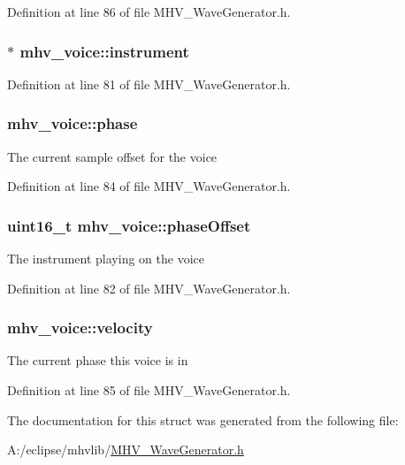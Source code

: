 Definition at line 86 of file M\-H\-V\-\_\-\-Wave\-Generator.\-h.

\hypertarget{structmhv__voice_ad13f45665cd3e683530f21ac2824aa5d}{
\subsubsection[{instrument}]{$\ast$ mhv\-\_\-voice\-::instrument}}\label{structmhv__voice_ad13f45665cd3e683530f21ac2824aa5d}


Definition at line 81 of file M\-H\-V\-\_\-\-Wave\-Generator.\-h.

\hypertarget{structmhv__voice_acb00a6c0fe99ecfebb9f5b1ed66c51be}{
\subsubsection[{phase}]{ mhv\-\_\-voice\-::phase}}\label{structmhv__voice_acb00a6c0fe99ecfebb9f5b1ed66c51be}
The current sample offset for the voice 

Definition at line 84 of file M\-H\-V\-\_\-\-Wave\-Generator.\-h.

\hypertarget{structmhv__voice_a24e2f2d4a979d1f00b338b48f741c217}{
\subsubsection[{phase\-Offset}]{\setlength{\rightskip}{0pt plus 5cm}uint16\-\_\-t mhv\-\_\-voice\-::phase\-Offset}}\label{structmhv__voice_a24e2f2d4a979d1f00b338b48f741c217}
The instrument playing on the voice 

Definition at line 82 of file M\-H\-V\-\_\-\-Wave\-Generator.\-h.

\hypertarget{structmhv__voice_a8f99a4e928e8698be419b3863232bc62}{
\subsubsection[{velocity}]{ mhv\-\_\-voice\-::velocity}}\label{structmhv__voice_a8f99a4e928e8698be419b3863232bc62}
The current phase this voice is in 

Definition at line 85 of file M\-H\-V\-\_\-\-Wave\-Generator.\-h.



The documentation for this struct was generated from the following file\-:\begin{DoxyCompactItemize}
\item 
A\-:/eclipse/mhvlib/\hyperlink{_m_h_v___wave_generator_8h}{M\-H\-V\-\_\-\-Wave\-Generator.\-h}\end{DoxyCompactItemize}

